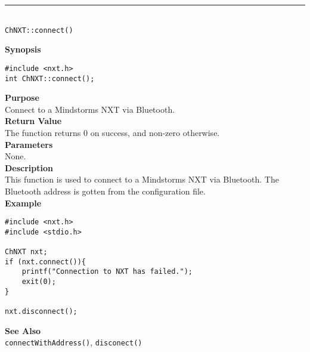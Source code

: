 \noindent
\vspace{5pt}
\rule{4.5in}{0.015in}\\
\noindent
{\LARGE \texttt{ChNXT::connect()} }\\


\noindent
{\bf Synopsis}
\vspace{-8pt}
\begin{verbatim}
#include <nxt.h>
int ChNXT::connect();
\end{verbatim}

\noindent
{\bf Purpose}\\
Connect to a Mindstorms NXT via Bluetooth.\\

\noindent
{\bf Return Value}\\
The function returns 0 on success, and non-zero otherwise.\\

\noindent
{\bf Parameters}\\
None.\\

\noindent
{\bf Description}\\
This function is used to connect to a Mindstorms NXT via Bluetooth. The Bluetooth address is gotten from the configuration file.\\

\noindent
{\bf Example}
\begin{verbatim}
#include <nxt.h> 
#include <stdio.h>

ChNXT nxt;
if (nxt.connect()){
    printf("Connection to NXT has failed.");
    exit(0);
}
    
nxt.disconnect();
\end{verbatim}

\noindent
{\bf See Also}\\
\texttt{connectWithAddress()}, \texttt{disconect()}\\
